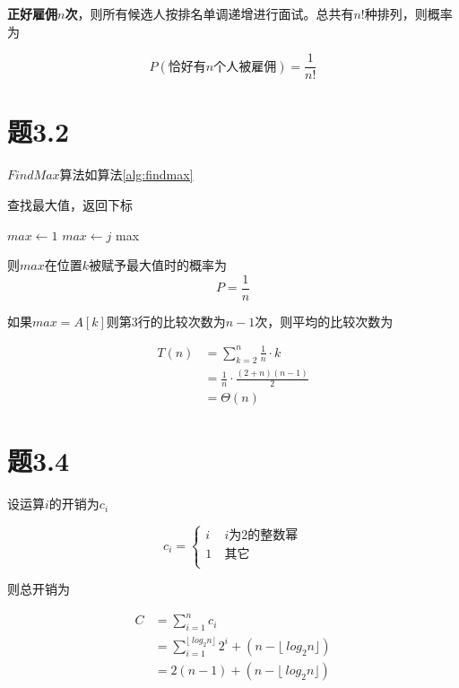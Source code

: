 \documentclass[a4paper,twoside]{article}
\begin{document}
\begin{spacing}{1.2}
\textbf{正好雇佣$n$次}，则所有候选人按排名单调递增进行面试。总共有$n!$种排列，则概率为

$$
P(\mbox{恰好有$n$个人被雇佣})=\frac{1}{n!}
$$

\section{题3.2}

$FindMax$算法如算法\ref{alg:findmax}

\begin{algorithm}
	\caption{查找最大值，返回下标}
	\label{alg:findmax}
	\begin{algorithmic}[1]
		\State $max \gets 1$
		\State $max \gets j$
		\EndIf
		\EndFor
		\Return max
		\EndProcedure
		
	\end{algorithmic}
\end{algorithm}

则$max$在位置$k$被赋予最大值时的概率为
$$
P=\frac{1}{n}
$$

如果$max=A[k]$则第$3$行的比较次数为$n-1$次，则平均的比较次数为

\begin{align*}
	T(n) &= \sum_{k=2}^{n}\frac{1}{n} \cdot k \\
	&= \frac{1}{n} \cdot \frac{(2+n)(n-1)}{2} \\
	&= \Theta(n)
\end{align*}

\section{题3.4}

设运算$i$的开销为$c_i$

$$ c_i=\left\{
\begin{aligned}
	i & \  \mbox{$i$为$2$的整数幂} \\
	1 & \  \mbox{其它} \\
\end{aligned}
\right.
$$

则总开销为

\begin{align*}
	C &= \sum_{i=1}^{n}c_i \\
	&= \sum_{i=1}^{\lfloor\ log_2 n \rfloor}2^i+(n-\lfloor\ log_2 n \rfloor) \\
	&=  2(n-1) + (n-\lfloor\ log_2 n \rfloor)
\end{align*}


\end{spacing}
\end{document}
